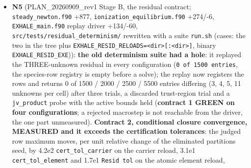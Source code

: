 \documentclass[english,a4paper]{my_memo}
\begin{document}
\begin{itemize}
  ended on N: the model promises no reduction" counted that defect wherever
  N exceeds the refused count (B5l\textquotesingle s 19 and 20 included). \texttt{wasp\_full\_newton}
  BITWISE on all ten output files (three log lines differ: two wall clocks,
  one new cap line). Tests RED on the extraction stage (4 of 43 fail: the
  measured floor rows and the sound-ratio rows), GREEN 43/0; advisor rebuild
  warning-free, \texttt{krylov\_and\_dogleg} 43/0, binary md5 \texttt{6d4bf63e} identical
  to the worker\textquotesingle s final. Two dead locals removed (md5 unchanged). Advisor:
  four British \texttt{neighbor} spellings in comments fixed. Advisor decision:
  P1\textquotesingle s measured floor stays (correct in form, one evaluation per iteration).
  \textbf{Reported, not fixed}: the ray test runs before the acceptance test, so
  a catastrophic over-prediction (ratio -533, -1493 at iterations 47, 50) is
  named a slope disagreement; \texttt{ray\_h\ =\ 1e-3} is not a measured interval;
  \texttt{tr\_dmax} doubles without an absolute cap and with P2 runs to 2.7e8
  (harmless, the interior point is taken, but \texttt{delta} stops being a
  diagnostic); \texttt{n\_tr\_exit} has no index guard.
\item
  \textbf{N5} (PLAN\_20260909\_rev1 Stage B, the residual contract;
  \texttt{steady\_newton.f90} +877, \texttt{ionization\_equilibrium.f90} +274/-6,
  \texttt{EXHALE\_main.f90} replay driver +134/-60, \texttt{src/tests/residual\_determinism/}
  rewritten with a suite \texttt{run.sh} (cases: the two in the tree plus
  \texttt{EXHALE\_RESID\_RELOADS=\textless{}dir\textgreater{}{[}:\textless{}dir\textgreater{}{]}}, binary \texttt{EXHALE\_RESID\_EXE})): \textbf{the old
  determinism suite had a hole}: it replayed the THREE-unknown residual in
  every configuration (\texttt{0\ of\ 1500\ entries}, the species-row registry is
  empty before a solve); the replay now registers the rows and returns 0 of
  1500 / 2000 / 2500 / 5500 entries differing (3, 4, 5, 11 unknowns per
  cell) after three trials, a discarded trust-region trial and a \texttt{jv\_product}
  probe with the active bounds held (\textbf{contract 1 GREEN on four
  configurations}; a rejected macrostep is not reachable from the driver,
  the one part unmeasured). \textbf{Contract 2, conditional closure convergence,
  MEASURED and it exceeds the certification tolerances}: the judged row
  maximum moves, per unit relative change of the eliminated partition\textquotesingle s
  seed, by 4.2e2 \texttt{cert\_tol\_carrier} on the carrier reload, 3.1e1
  \texttt{cert\_tol\_element} and 1.7e1 \texttt{Resid\ tol} on the atomic element reload,

\end{itemize}
\end{document}
